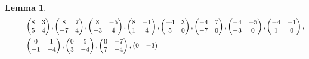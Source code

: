 \documentclass[12pt]{article}
\theoremstyle{definition}
\newtheorem{lemma}[theorem]{Lemma}
\numberwithin{equation}{section}
\numberwithin{theorem}{section}
\begin{document}
\begin{lemma}
{\begin{align}
&\hspace{10mm}
\begin{pmatrix}
8 & 3 \\
5 & 4
\end{pmatrix}, 
\begin{pmatrix}
8 & 7 \\
-7 & 4
\end{pmatrix}, 
\begin{pmatrix}
8 & -5 \\
-3 & 4
\end{pmatrix}, 
\begin{pmatrix}
8 & -1 \\
1 & 4
\end{pmatrix}, 
\begin{pmatrix}
-4 & 3 \\
5 & 0
\end{pmatrix}, 
\begin{pmatrix}
-4 & 7 \\
-7 & 0
\end{pmatrix}, 
\begin{pmatrix}
-4 & -5 \\
-3 & 0
\end{pmatrix}, 
\begin{pmatrix}
-4 & -1 \\
1 & 0
\end{pmatrix},  \notag  \\
&\hspace{10mm}
\begin{pmatrix}
0 & 1 \\
-1 & -4
\end{pmatrix}, 
\begin{pmatrix}
0 & 5 \\
3 & -4
\end{pmatrix}, 
\begin{pmatrix}
0 & -7 \\
7 & -4
\end{pmatrix}, 
\begin{pmatrix}
0 & -3 \\

\end{pmatrix}
\end{align}}
\end{lemma}
\end{document}
